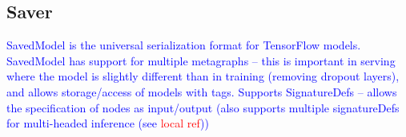 \subsection{Saver}

\textcolor{blue}{SavedModel is the universal serialization format for TensorFlow models. SavedModel has support for multiple metagraphs -- this is important in serving where the model is slightly different than in training (removing dropout layers), and allows storage/access of models with tags. Supports SignatureDefs -- allows the specification of nodes as input/output (also supports multiple signatureDefs for multi-headed inference (see \textcolor{red}{local ref}))}